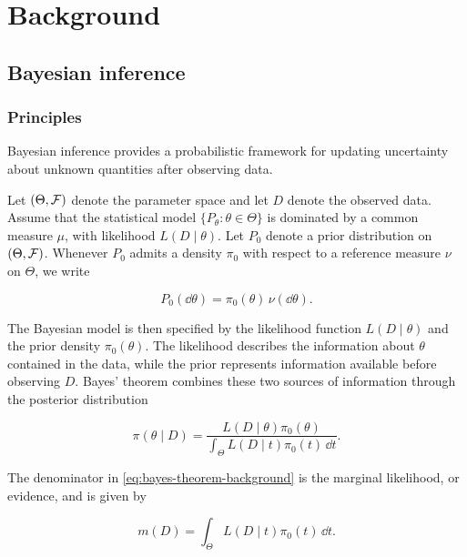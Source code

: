 \chapter{Background}

\section{Bayesian inference}
\label{sec:bayesian-inference}

\subsection{Principles}

Bayesian inference provides a probabilistic framework for updating uncertainty about unknown quantities after observing data.

Let $(\Theta,\mathcal{F})$ denote the parameter space and let $D$ denote the observed data.
Assume that the statistical model
$\{P_\theta : \theta \in \Theta\}$
is dominated by a common measure $\mu$, with likelihood
$L(D \mid \theta)$.
Let $P_0$ denote a prior distribution on $(\Theta,\mathcal{F})$.
Whenever $P_0$ admits a density $\pi_0$ with respect to a reference measure $\nu$ on $\Theta$, we write

\begin{equation}
P_0(\dd\theta)
=
\pi_0(\theta)\,\nu(\dd\theta).
\end{equation}

The Bayesian model is then specified by the likelihood function
$L(D\mid\theta)$
and the prior density
$\pi_0(\theta)$.
The likelihood describes the information about $\theta$ contained in the data, while the prior represents information available before observing $D$.
Bayes' theorem combines these two sources of information through the posterior distribution

\begin{equation}
    \pi(\theta\mid D)
    =
    \frac{L(D\mid\theta)\pi_0(\theta)}
    {\int_{\Theta} L(D\mid t)\pi_0(t)\,\dd t}.
    \label{eq:bayes-theorem-background}
\end{equation}

The denominator in \eqref{eq:bayes-theorem-background} is the marginal likelihood, or evidence, and is given by

\begin{equation}
    m(D)
    =
    \int_{\Theta} L(D\mid t)\pi_0(t)\,\dd t.
    \label{eq:marginal-likelihood-background}
\end{equation}

